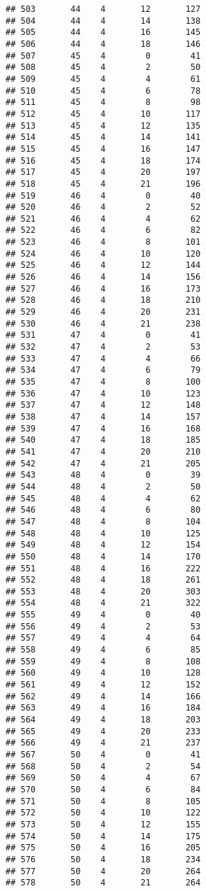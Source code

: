 \documentclass[
]{article}
\begin{document}
\begin{verbatim}
## 503       44    4       12       127
## 504       44    4       14       138
## 505       44    4       16       145
## 506       44    4       18       146
## 507       45    4        0        41
## 508       45    4        2        50
## 509       45    4        4        61
## 510       45    4        6        78
## 511       45    4        8        98
## 512       45    4       10       117
## 513       45    4       12       135
## 514       45    4       14       141
## 515       45    4       16       147
## 516       45    4       18       174
## 517       45    4       20       197
## 518       45    4       21       196
## 519       46    4        0        40
## 520       46    4        2        52
## 521       46    4        4        62
## 522       46    4        6        82
## 523       46    4        8       101
## 524       46    4       10       120
## 525       46    4       12       144
## 526       46    4       14       156
## 527       46    4       16       173
## 528       46    4       18       210
## 529       46    4       20       231
## 530       46    4       21       238
## 531       47    4        0        41
## 532       47    4        2        53
## 533       47    4        4        66
## 534       47    4        6        79
## 535       47    4        8       100
## 536       47    4       10       123
## 537       47    4       12       148
## 538       47    4       14       157
## 539       47    4       16       168
## 540       47    4       18       185
## 541       47    4       20       210
## 542       47    4       21       205
## 543       48    4        0        39
## 544       48    4        2        50
## 545       48    4        4        62
## 546       48    4        6        80
## 547       48    4        8       104
## 548       48    4       10       125
## 549       48    4       12       154
## 550       48    4       14       170
## 551       48    4       16       222
## 552       48    4       18       261
## 553       48    4       20       303
## 554       48    4       21       322
## 555       49    4        0        40
## 556       49    4        2        53
## 557       49    4        4        64
## 558       49    4        6        85
## 559       49    4        8       108
## 560       49    4       10       128
## 561       49    4       12       152
## 562       49    4       14       166
## 563       49    4       16       184
## 564       49    4       18       203
## 565       49    4       20       233
## 566       49    4       21       237
## 567       50    4        0        41
## 568       50    4        2        54
## 569       50    4        4        67
## 570       50    4        6        84
## 571       50    4        8       105
## 572       50    4       10       122
## 573       50    4       12       155
## 574       50    4       14       175
## 575       50    4       16       205
## 576       50    4       18       234
## 577       50    4       20       264
## 578       50    4       21       264
\end{verbatim}
\end{document}

